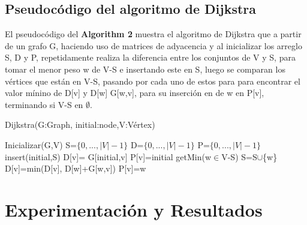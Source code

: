 \documentclass[12pt,twoside]{article}
\begin{document}
    \subsection{Pseudoc\'odigo del algoritmo de Dijkstra}
        El pseudoc\'odigo del {\bf Algorithm 2} muestra el algoritmo de Dijkstra que a partir de un grafo G, haciendo uso de matrices de adyacencia y al inicializar los arreglo S, D y P, repetidamente realiza la diferencia entre los conjuntos de V y S, para tomar el menor peso w de V-S e insertando este en S, luego se comparan los v\'ertices que est\'an en V-S, pasando por cada uno de estos para para encontrar el valor m\'inino de D[v] y D[w] G[w,v], para su inserci\'on en de w en P[v], terminando si V-S en $\emptyset$.
        \begin{algorithm}[H]
        \caption{ Dijkstra(G:Graph, initial:node,V:V\'ertex)}
            \begin{algorithmic}[1]
            \State Inicializar(G,V)
            \State S=$\{0,...,|V|-1\}$
            \State D=$\{0,...,|V|-1\}$
            \State P=$\{0,...,|V|-1\}$
            \State insert(initial,S)
                \State D[v]= G[initial,v]
                \State P[v]=initial
            \EndFor
                \State getMin(w$\in$V-S)
                \State S=S$\cup$\{w\}
                    \State D[v]=min(D[v], D[w]+G[w,v])
                        \State P[v]=w
                    \EndIf
                \EndFor
            \EndWhile
            \end{algorithmic}
        \end{algorithm}

\section{Experimentaci\'on y Resultados}
\end{document}
